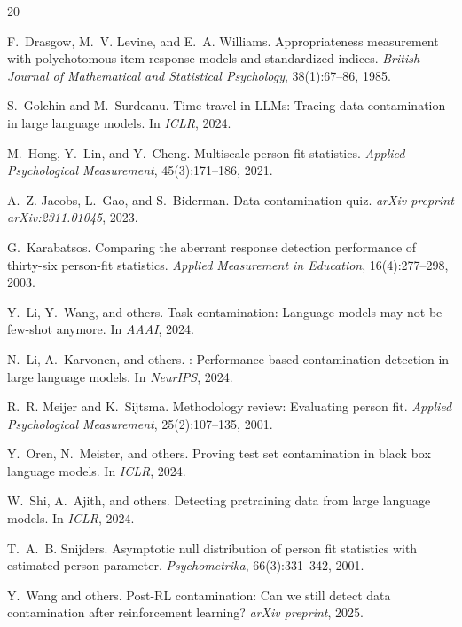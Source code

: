 \documentclass[11pt,a4paper]{article}
\begin{document}
\begin{thebibliography}{20}

F.~Drasgow, M.~V. Levine, and E.~A. Williams.
\newblock Appropriateness measurement with polychotomous item response models and standardized indices.
\newblock \emph{British Journal of Mathematical and Statistical Psychology}, 38(1):67--86, 1985.

S.~Golchin and M.~Surdeanu.
\newblock Time travel in {LLM}s: Tracing data contamination in large language models.
\newblock In \emph{ICLR}, 2024.

M.~Hong, Y.~Lin, and Y.~Cheng.
\newblock Multiscale person fit statistics.
\newblock \emph{Applied Psychological Measurement}, 45(3):171--186, 2021.

A.~Z. Jacobs, L.~Gao, and S.~Biderman.
\newblock Data contamination quiz.
\newblock \emph{arXiv preprint arXiv:2311.01045}, 2023.

G.~Karabatsos.
\newblock Comparing the aberrant response detection performance of thirty-six person-fit statistics.
\newblock \emph{Applied Measurement in Education}, 16(4):277--298, 2003.

Y.~Li, Y.~Wang, and others.
\newblock Task contamination: Language models may not be few-shot anymore.
\newblock In \emph{AAAI}, 2024.

N.~Li, A.~Karvonen, and others.
: Performance-based contamination detection in large language models.
\newblock In \emph{NeurIPS}, 2024.

R.~R. Meijer and K.~Sijtsma.
\newblock Methodology review: Evaluating person fit.
\newblock \emph{Applied Psychological Measurement}, 25(2):107--135, 2001.

Y.~Oren, N.~Meister, and others.
\newblock Proving test set contamination in black box language models.
\newblock In \emph{ICLR}, 2024.

W.~Shi, A.~Ajith, and others.
\newblock Detecting pretraining data from large language models.
\newblock In \emph{ICLR}, 2024.

T.~A.~B. Snijders.
\newblock Asymptotic null distribution of person fit statistics with estimated person parameter.
\newblock \emph{Psychometrika}, 66(3):331--342, 2001.

Y.~Wang and others.
\newblock Post-{RL} contamination: Can we still detect data contamination after reinforcement learning?
\newblock \emph{arXiv preprint}, 2025.

\end{thebibliography}
\end{document}
